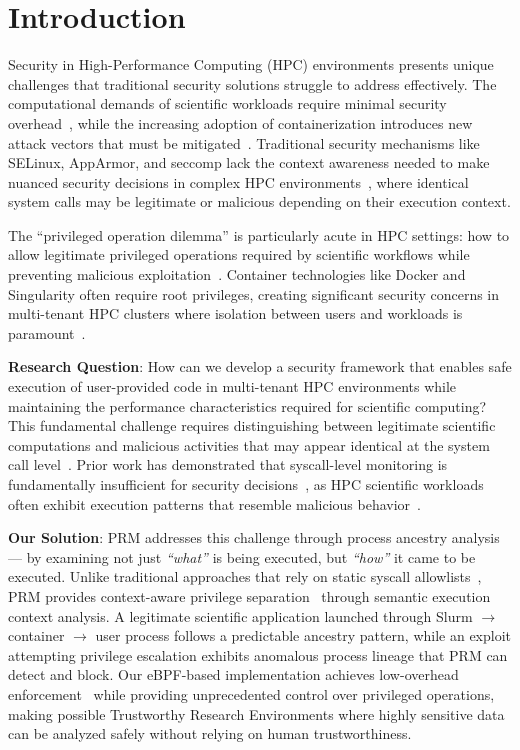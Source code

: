 \documentclass[]{sn-jnl}
\begin{document}
\section{Introduction}

Security in High-Performance Computing (HPC) environments presents unique
challenges that traditional security solutions struggle to address effectively.
The computational demands of scientific workloads require minimal security
overhead~\cite{zhang2021analyzing,xavier2013performance}, while the increasing
adoption of containerization introduces new attack vectors that must be
mitigated~\cite{reshetova2016security,rudyy2018containers}. Traditional security
mechanisms like SELinux, AppArmor, and seccomp lack the context awareness needed
to make nuanced security decisions in complex HPC
environments~\cite{provos2003improving,li2018speaker}, where identical system
calls may be legitimate or malicious depending on their execution context.

The ``privileged operation dilemma'' is particularly acute in HPC settings: how
to allow legitimate privileged operations required by scientific workflows while
preventing malicious exploitation~\cite{kurtzer2017singularity,priedhorsky2017charliecloud}.
Container technologies like Docker and Singularity often require root privileges,
creating significant security concerns in multi-tenant HPC clusters where
isolation between users and workloads is
paramount~\cite{canon2016scream,torrez2019hpc}.

\textbf{Research Question}: How can we develop a security framework that enables
safe execution of user-provided code in multi-tenant HPC environments while
maintaining the performance characteristics required for scientific computing?
This fundamental challenge requires distinguishing between legitimate scientific
computations and malicious activities that may appear identical at the system
call level~\cite{pappas2013kbouncer,ghavamnia2020confine}. Prior work has
demonstrated that syscall-level monitoring is fundamentally insufficient for
security decisions~\cite{wang2021semantic}, as HPC scientific workloads often
exhibit execution patterns that resemble malicious
behavior~\cite{vasilakis2019hpc}.

\textbf{Our Solution}: PRM addresses this challenge through process ancestry
analysis --- by examining not just \textit{``what''} is being executed, but
\textit{``how''} it came to be executed. Unlike traditional approaches that rely
on static syscall allowlists~\cite{ghavamnia2020confine}, PRM provides
context-aware privilege separation~\cite{ghavamnia2020confine} through semantic
execution context analysis. A legitimate scientific application launched through
Slurm $\rightarrow$ container $\rightarrow$ user process follows a predictable
ancestry pattern, while an exploit attempting privilege escalation exhibits
anomalous process lineage that PRM can detect and block. Our eBPF-based
implementation achieves low-overhead enforcement~\cite{nelson2020ebpf} while
providing unprecedented control over privileged operations, making possible
Trustworthy Research Environments where highly sensitive data can be analyzed
safely without relying on human trustworthiness.
\end{document}
